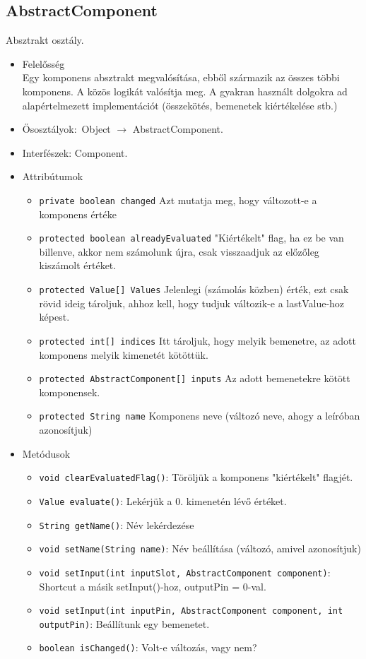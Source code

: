 \subsection{AbstractComponent}
Absztrakt osztály.
\begin{itemize}
\item Felelősség\\
Egy komponens absztrakt megvalósítása, ebből származik az összes többi  komponens. A közös logikát valósítja meg. A gyakran használt dolgokra  ad alapértelmezett implementációt (összekötés, bemenetek kiértékelése stb.)
\item Ősosztályok:\ Object $\rightarrow{}$ AbstractComponent.
\item Interfészek: Component.
\item Attribútumok $\ $
\begin{itemize}
	\item \texttt{private boolean changed} Azt mutatja meg, hogy változott-e a komponens értéke
	\item \texttt{protected boolean alreadyEvaluated} "Kiértékelt" flag, ha ez be van billenve, akkor nem számolunk újra, csak visszaadjuk az előzőleg kiszámolt értéket.
	
	\item \texttt{protected Value[] Values} Jelenlegi (számolás közben) érték, ezt csak rövid ideig tároljuk, ahhoz kell, hogy tudjuk változik-e a lastValue-hoz képest.
	
	\item \texttt{protected int[] indices} Itt tároljuk, hogy melyik bemenetre, az adott komponens melyik kimenetét kötöttük.
	
	\item \texttt{protected AbstractComponent[] inputs} Az adott bemenetekre kötött komponensek.
	\item \texttt{protected String name} Komponens neve (változó neve, ahogy a leíróban azonosítjuk)
\end{itemize}
\item Metódusok$\ $
\begin{itemize}
	\item \texttt{void clearEvaluatedFlag()}: Töröljük a komponens "kiértékelt" flagjét.
	\item \texttt{Value evaluate()}: Lekérjük a 0. kimenetén lévő értéket.
	\item \texttt{String getName()}: Név lekérdezése
	\item \texttt{void setName(String name)}: Név beállítása (változó, amivel azonosítjuk)
	\item \texttt{void setInput(int inputSlot, AbstractComponent component)}: Shortcut a másik setInput()-hoz, outputPin = 0-val.
	\item \texttt{void setInput(int inputPin, AbstractComponent component, int outputPin)}: Beállítunk egy bemenetet.
	\item \texttt{boolean isChanged()}: Volt-e változás, vagy nem?

	
\end{itemize}
\end{itemize}

